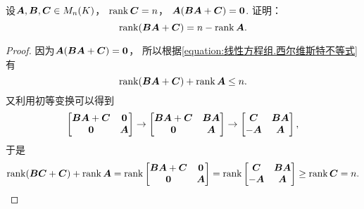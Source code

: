 \begin{example}
设\(\vb{A},\vb{B},\vb{C} \in M_n(K)\)，
\(\rank\vb{C}=n\)，
\(\vb{A}(\vb{B}\vb{A}+\vb{C})=\vb0\).
证明：\[
	\rank(\vb{B}\vb{A}+\vb{C})=n-\rank\vb{A}.
\]
\begin{proof}
因为\(\vb{A}(\vb{B}\vb{A}+\vb{C})=\vb0\)，
所以根据\cref{equation:线性方程组.西尔维斯特不等式} 有\[
	\rank(\vb{B}\vb{A}+\vb{C})+\rank\vb{A} \leq n.
\]
又利用初等变换可以得到\[
	\begin{bmatrix}
		\vb{B}\vb{A}+\vb{C} & \vb0 \\
		\vb0 & \vb{A}
	\end{bmatrix}
	\to \begin{bmatrix}
		\vb{B}\vb{A}+\vb{C} & \vb{B}\vb{A} \\
		\vb0 & \vb{A}
	\end{bmatrix}
	\to \begin{bmatrix}
		\vb{C} & \vb{B}\vb{A} \\
		-\vb{A} & \vb{A}
	\end{bmatrix},
\]
于是\[
	\rank(\vb{B}\vb{C}+\vb{C})
	+\rank\vb{A}
	= \rank\begin{bmatrix}
		\vb{B}\vb{A}+\vb{C} & \vb0 \\
		\vb0 & \vb{A}
	\end{bmatrix}
	= \rank\begin{bmatrix}
		\vb{C} & \vb{B}\vb{A} \\
		-\vb{A} & \vb{A}
	\end{bmatrix}
	\geq \rank\vb{C} = n.
	\qedhere
\]
\end{proof}
\end{example}

